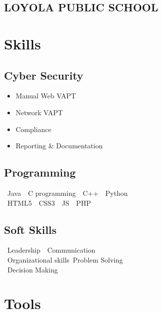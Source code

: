 \documentclass[]{roshan-resume}
\begin{document}
\begin{minipage}[t]{0.33\textwidth}
		\subsection{LOYOLA PUBLIC SCHOOL}
		
		
		
		
		\section{Skills}
		\subsection{Cyber Security}
		\begin{itemize}
			\item Manual Web VAPT \\ 
			\item Network VAPT \\
			\item Compliance \\
			\item Reporting \& Documentation	
		\end{itemize}
		\subsection{Programming}
		\textbullet\ Java\ \textbullet\ C programming\ \textbullet\ C++\ \textbullet\ Python \\
		\textbullet\ HTML5\ \textbullet\ CSS3\ \textbullet\ JS\ \textbullet\ PHP 
		\sectionsep
		\subsection{Soft Skills}
		\textbullet\ Leadership\ \textbullet\ Communication\\
		\textbullet\ Organizational skills\ \textbullet Problem Solving \\
		\textbullet\ Decision Making 
		\sectionsep
		\section{Tools}

\end{minipage}
\end{document}
